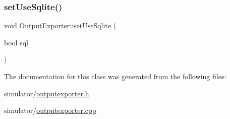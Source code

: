 \mbox{\label{class_output_exporter_a17902545a956dbc8aaddda2e3561fdc3}} 
\subsubsection{\texorpdfstring{setUseSqlite()}{setUseSqlite()}}
{\footnotesize\ttfamily void Output\+Exporter\+::set\+Use\+Sqlite (\begin{DoxyParamCaption}\item[{bool}]{sql }\end{DoxyParamCaption})\hspace{0.3cm}{\ttfamily [inline]}}



The documentation for this class was generated from the following files\+:\begin{DoxyCompactItemize}
\item 
simulator/\mbox{\hyperlink{outputexporter_8h}{outputexporter.\+h}}\item 
simulator/\mbox{\hyperlink{outputexporter_8cpp}{outputexporter.\+cpp}}\end{DoxyCompactItemize}
